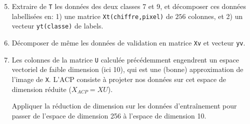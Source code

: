 \begin{enumerate}
\setcounter{enumi}{4}
\item Extraire de \texttt{T} les données des deux classes 7 et 9, et décomposer ces données labellisées en: 1) une matrice \texttt{Xt(chiffre,pixel)} de $256$ colonnes, et 2) un vecteur \texttt{yt(classe)} de labels.

\item Décomposer de même les données de validation en matrice \texttt{Xv} et vecteur \texttt{yv}.

\item Les colonnes de la matrice \texttt{U} calculée précédemment engendrent un espace vectoriel de faible dimension (ici 10), qui est une (bonne) approximation de l'image de \texttt{X}. L'ACP consiste à projeter nos données sur cet espace de dimension réduite ($X_{ACP} = XU$).

Appliquer la réduction de dimension sur les données d'entraînement pour passer de l'espace de dimension 256 à l'espace de dimension 10.
\end{enumerate}